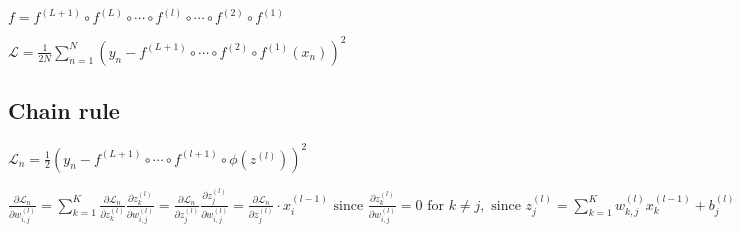
$
f=f^{(L+1)} \circ f^{(L)} \circ \cdots \circ f^{(l)} \circ \cdots \circ f^{(2)} \circ f^{(1)}
$

$
\mathscr{L}=\frac{1}{2 N} \sum_{n=1}^{N}\left(y_{n}-f^{(L+1)} \circ \cdots \circ f^{(2)} \circ f^{(1)}\left(x_{n}\right)\right)^{2}
$








\subsection*{Chain rule}
$
\mathscr{L}_{n}=\frac{1}{2}\left(y_{n}-f^{(L+1)} \circ \cdots \circ f^{(l+1)} \circ \phi\left(z^{(l)}\right)\right)^{2}
$


$
\frac{\partial \mathscr{L}_{n}}{\partial w_{i, j}^{(l)}} =\sum_{k=1}^{K} \frac{\partial \mathscr{L}_{n}}{\partial z_{k}^{(l)}} \frac{\partial z_{k}^{(l)}}{\partial w_{i, j}^{(l)}}
=\frac{\partial \mathscr{L}_{n}}{\partial z_{j}^{(l)}} \frac{\partial z_{j}^{(l)}}{\partial w_{i, j}^{(l)}} 
=\frac{\partial \mathscr{L}_{n}}{\partial z_{j}^{(l)}} \cdot x_{i}^{(l-1)}
\text { since } \frac{\partial z_{k}^{(l)}}{\partial w_{i, j}^{(l)}}=0 \text { for } k \neq j,
\text { since } z_{j}^{(l)}=\sum_{k=1}^{K} w_{k, j}^{(l)} x_{k}^{(l-1)}+b_{j}^{(l)}
$


